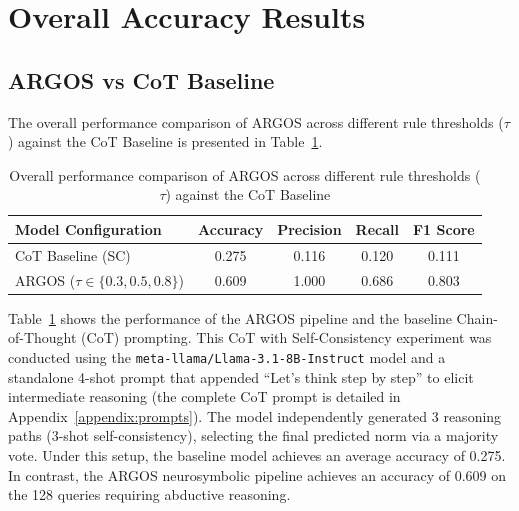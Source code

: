\section{Overall Accuracy Results}
\label{sec:overallAccuracy}


\subsection{ARGOS vs CoT Baseline}
\label{sec:argosVsBaselines}

The overall performance comparison of ARGOS across different rule thresholds ($\tau$) against the CoT Baseline is presented in Table~\ref{tab:overall_results}.

\begin{table}[ht]
    \centering
    \caption{Overall performance comparison of ARGOS across different rule thresholds ($\tau$) against the CoT Baseline}
    \label{tab:overall_results}
    \begin{tabular}{lcccc}
        \toprule
        \textbf{Model Configuration} & \textbf{Accuracy} & \textbf{Precision} & \textbf{Recall} & \textbf{F1 Score} \\
        \midrule
        CoT Baseline (SC) & 0.275 & 0.116 & 0.120 & 0.111 \\
        ARGOS ($\tau \in \{0.3, 0.5, 0.8\}$) & 0.609 & 1.000 & 0.686 & 0.803 \\
        \bottomrule
    \end{tabular}
\end{table}

Table~\ref{tab:overall_results} shows the performance of the ARGOS pipeline and the baseline Chain-of-Thought (CoT) prompting. This CoT with Self-Consistency experiment was conducted using the \texttt{meta-llama/Llama-3.1-8B-Instruct} model and a standalone 4-shot prompt that appended ``Let's think step by step'' to elicit intermediate reasoning (the complete CoT prompt is detailed in Appendix~\ref{appendix:prompts}). The model independently generated 3 reasoning paths (3-shot self-consistency), selecting the final predicted norm via a majority vote. Under this setup, the baseline model achieves an average accuracy of 0.275. In contrast, the ARGOS neurosymbolic pipeline achieves an accuracy of 0.609 on the 128 queries requiring abductive reasoning.

